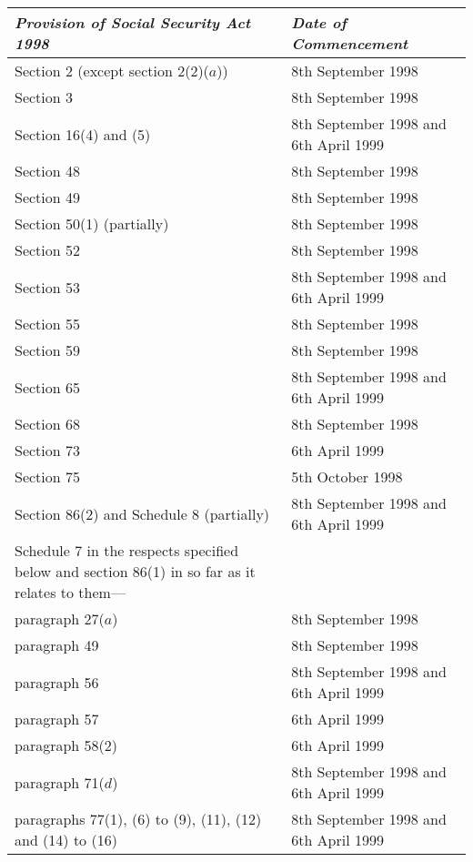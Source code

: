\documentclass[12pt,a4paper]{article}
\begin{document}
{\footnotesize

\noindent
  \begin{longtable}{p{265pt}p{110pt}}
\hline
\itshape Provision of Social Security Act 1998 & \itshape Date of Commencement\\
\hline
  \endhead
  \hline
  \endlastfoot
Section 2 (except section 2(2)($a$))&8th September 1998\\
Section 3&8th September 1998\\
Section 16(4) and (5)&8th September 1998 and 6th April 1999\\
Section 48&8th September 1998\\
Section 49&8th September 1998\\
Section 50(1) (partially)&8th September 1998\\
Section 52&8th September 1998\\
Section 53&8th September 1998 and 6th April 1999\\
Section 55&8th September 1998\\
Section 59&8th September 1998\\
Section 65&8th September 1998 and 6th April 1999\\
Section 68&8th September 1998\\
Section 73&6th April 1999\\
Section 75&5th October 1998\\
Section 86(2) and Schedule 8 (partially)&8th September 1998 and 6th April 1999\\
Schedule 7 in the respects specified below and section 86(1) in so far as it relates to them---\\
\hspace{1em} paragraph 27($a$)&8th September 1998\\
\hspace{1em} paragraph 49&8th September 1998\\
\hspace{1em} paragraph 56&8th September 1998 and 6th April 1999\\
\hspace{1em} paragraph 57&6th April 1999\\
\hspace{1em} paragraph 58(2)&6th April 1999\\
\hspace{1em} paragraph 71($d$)&8th September 1998 and 6th April 1999\\
\hspace{1em} paragraphs 77(1), (6) to (9), (11), (12) and (14) to (16)&8th September 1998 and 6th April 1999\\

\end{longtable}}
\end{document}
